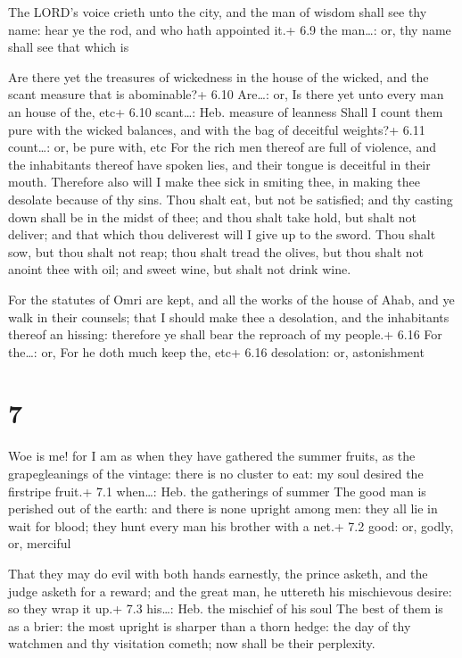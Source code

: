  The LORD's voice crieth unto the city, and the man of
wisdom shall see thy name: hear ye the rod, and who hath appointed it.+
6.9 the man\ldots: or, thy name shall see that which is

 Are there yet the treasures of wickedness in the house
of the wicked, and the scant measure that is abominable?+ 6.10
Are\ldots: or, Is there yet unto every man an house of the, etc+ 6.10
scant\ldots: Heb. measure of leanness  Shall I count them
pure with the wicked balances, and with the bag of deceitful weights?+
6.11 count\ldots: or, be pure with, etc  For the rich men
thereof are full of violence, and the inhabitants thereof have spoken
lies, and their tongue is deceitful in their mouth. 
Therefore also will I make thee sick in smiting thee, in making thee
desolate because of thy sins.  Thou shalt eat, but not be
satisfied; and thy casting down shall be in the midst of thee; and thou
shalt take hold, but shalt not deliver; and that which thou deliverest
will I give up to the sword.  Thou shalt sow, but thou
shalt not reap; thou shalt tread the olives, but thou shalt not anoint
thee with oil; and sweet wine, but shalt not drink wine.

 For the statutes of Omri are kept, and all the works of
the house of Ahab, and ye walk in their counsels; that I should make
thee a desolation, and the inhabitants thereof an hissing: therefore ye
shall bear the reproach of my people.+ 6.16 For the\ldots: or, For he
doth much keep the, etc+ 6.16 desolation: or, astonishment

\hypertarget{section-6}{%
\section{7}\label{section-6}}

 Woe is me! for I am as when they have gathered the summer
fruits, as the grapegleanings of the vintage: there is no cluster to
eat: my soul desired the firstripe fruit.+ 7.1 when\ldots: Heb. the
gatherings of summer  The good man is perished out of the
earth: and there is none upright among men: they all lie in wait for
blood; they hunt every man his brother with a net.+ 7.2 good: or, godly,
or, merciful

 That they may do evil with both hands earnestly, the
prince asketh, and the judge asketh for a reward; and the great man, he
uttereth his mischievous desire: so they wrap it up.+ 7.3 his\ldots:
Heb. the mischief of his soul  The best of them is as a
brier: the most upright is sharper than a thorn hedge: the day of thy
watchmen and thy visitation cometh; now shall be their perplexity.

